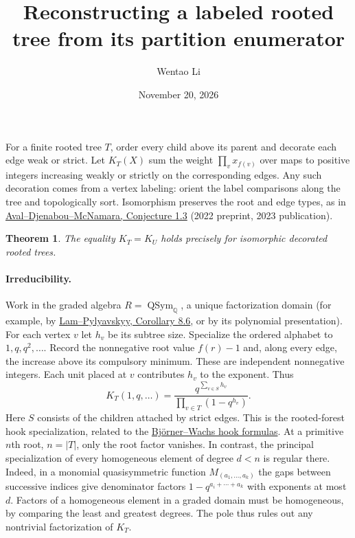 \documentclass[11pt]{article}
\title{Reconstructing a labeled rooted tree from its partition enumerator}
\author{Wentao Li}
\date{November 20, 2026}
\newtheorem{theorem}{Theorem}
\newcommand{\Q}{\mathbb Q}
\DeclareMathOperator{\QSym}{QSym}
\begin{document}
\maketitle

For a finite rooted tree $T$, order every child above its parent and decorate each edge weak or strict. Let $K_T(X)$ sum the weight $\prod_v x_{f(v)}$ over maps to positive integers increasing weakly or strictly on the corresponding edges. Any such decoration comes from a vertex labeling: orient the label comparisons along the tree and topologically sort. Isomorphism preserves the root and edge types, as in \href{https://doi.org/10.5802/alco.273}{Aval--Djenabou--McNamara, Conjecture 1.3} (2022 preprint, 2023 publication).
\begin{theorem}The equality $K_T=K_U$ holds precisely for isomorphic decorated rooted trees.\end{theorem}
\paragraph{Irreducibility.}
Work in the graded algebra $R=\QSym_{\Q}$, a unique factorization domain (for example, by \href{https://arxiv.org/abs/math/0609249}{Lam--Pylyavskyy, Corollary 8.6}, or by its polynomial presentation). For each vertex $v$ let $h_v$ be its subtree size. Specialize the ordered alphabet to $1,q,q^2,\ldots$. Record the nonnegative root value $f(r)-1$ and, along every edge, the increase above its compulsory minimum. These are independent nonnegative integers. Each unit placed at $v$ contributes $h_v$ to the exponent. Thus
\[
 K_T(1,q,\ldots)=
 \frac{q^{\sum_{v\in S}h_v}}
 {\prod_{v\in T}(1-q^{h_v})}.
\]
Here $S$ consists of the children attached by strict edges. This is the rooted-forest hook specialization, related to the \href{https://doi.org/10.1016/0097-3165(89)90028-9}{Björner--Wachs hook formulas}. At a primitive $n$th root, $n=|T|$, only the root factor vanishes. In contrast, the principal specialization of every homogeneous element of degree $d<n$ is regular there. Indeed, in a monomial quasisymmetric function $M_{(a_1,\ldots,a_k)}$ the gaps between successive indices give denominator factors $1-q^{a_i+\cdots+a_k}$ with exponents at most $d$. Factors of a homogeneous element in a graded domain must be homogeneous, by comparing the least and greatest degrees. The pole thus rules out any nontrivial factorization of $K_T$.
\end{document}
